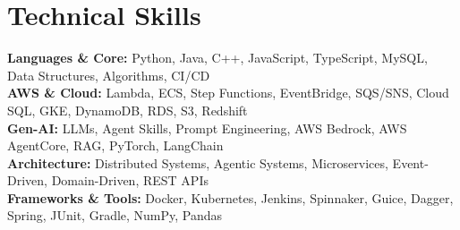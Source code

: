 
\section{Technical Skills}
    \begin{itemize}[leftmargin=0.15in, label={}]
	\small{\item{
    \textbf{Languages \& Core:} Python, Java, C++, JavaScript, TypeScript, MySQL, Data Structures, Algorithms, CI/CD \\[4pt]
    \textbf{AWS \& Cloud:} Lambda, ECS, Step Functions, EventBridge, SQS/SNS, Cloud SQL, GKE, DynamoDB, RDS, S3, Redshift  \\[4pt]
    \textbf{Gen-AI:} LLMs, Agent Skills, Prompt Engineering, AWS Bedrock, AWS AgentCore, RAG, PyTorch, LangChain  \\[4pt]
    \textbf{Architecture:} Distributed Systems, Agentic Systems, Microservices, Event-Driven, Domain-Driven, REST APIs\\[4pt]
    \textbf{Frameworks \& Tools:} Docker, Kubernetes, Jenkins, Spinnaker, Guice, Dagger, Spring, JUnit, Gradle, NumPy, Pandas
    }}
    \end{itemize}
